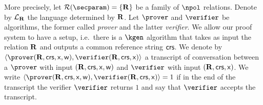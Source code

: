 \let\accentvec\vec \documentclass[runningheads,10pt]{llncs}
\begin{document}
More precisely, let $\RELGEN(\secparam) = \smallset{\REL}$ be a family of
$\npol$ relations.
Denote by $\mathcal{L}_{\mathbf{R}}$ the language determined by $\mathbf{R}$.
Let $\prover$ and $\verifier$ be algorithms, the former called \emph{prover}
and the latter \emph{verifier}. We allow our proof system to have a setup,
i.e.~there is a $\kgen$ algorithm that takes as input the relation $\mathbf{R}$ and
outputs a common reference string $\mathsf{crs}$.
We denote by $\ip{\prover(\REL, \crs, \inp, \wit)}{\verifier(\REL,
\crs,\inp)}$ a transcript of conversation between a $\prover$ with input
$(\mathbf{R}, \mathsf{crs}, \mathsf{x}, \mathsf{w})$ and $\verifier$ with input $(\mathbf{R}, \mathsf{crs}, \mathsf{x})$.
We write $\ip{\prover (\REL, \crs, \inp, \wit)}{\verifier(\REL, \crs, \inp)} = 1$ if in the end of the transcript the verifier $\verifier$ returns $1$ and say that $\verifier$ accepts the transcript.
\end{document}
